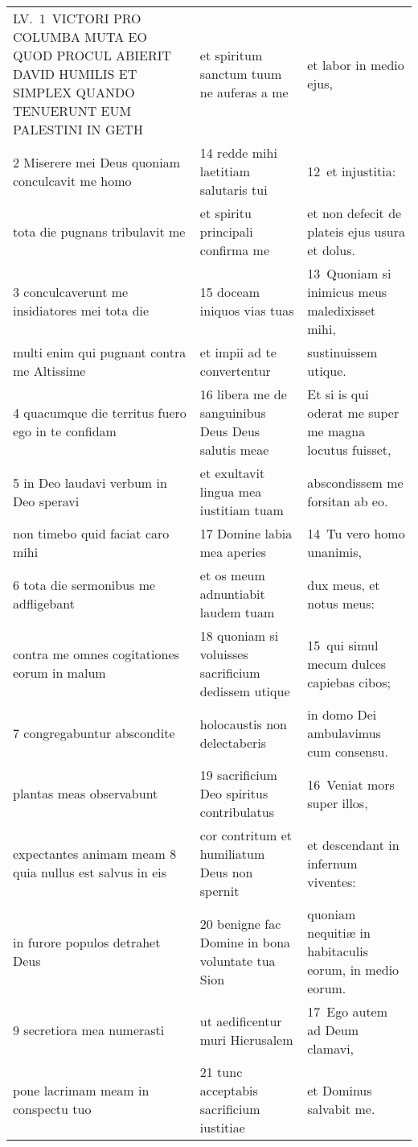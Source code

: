 \documentclass{article}
\begin{document}
\begin{longtable}{@{}p{}p{}p{}@{}}
LV. 1 VICTORI PRO COLUMBA MUTA EO QUOD PROCUL ABIERIT DAVID HUMILIS ET SIMPLEX QUANDO TENUERUNT EUM PALESTINI IN GETH	&	et spiritum sanctum tuum ne auferas a me	&	et labor in medio ejus,	\\
2 Miserere mei Deus quoniam conculcavit me homo	&	14 redde mihi laetitiam salutaris tui	&	12 et injustitia:	\\
tota die pugnans tribulavit me	&	et spiritu principali confirma me	&	et non defecit de plateis ejus usura et dolus.	\\
3 conculcaverunt me insidiatores mei tota die	&	15 doceam iniquos vias tuas	&	13 Quoniam si inimicus meus maledixisset mihi,	\\
multi enim qui pugnant contra me Altissime	&	et impii ad te convertentur	&	sustinuissem utique.	\\
4 quacumque die territus fuero ego in te confidam	&	16 libera me de sanguinibus Deus Deus salutis meae	&	Et si is qui oderat me super me magna locutus fuisset,	\\
5 in Deo laudavi verbum in Deo speravi	&	et exultavit lingua mea iustitiam tuam	&	abscondissem me forsitan ab eo.	\\
non timebo quid faciat caro mihi	&	17 Domine labia mea aperies	&	14 Tu vero homo unanimis,	\\
6 tota die sermonibus me adfligebant	&	et os meum adnuntiabit laudem tuam	&	dux meus, et notus meus:	\\
contra me omnes cogitationes eorum in malum	&	18 quoniam si voluisses sacrificium dedissem utique	&	15 qui simul mecum dulces capiebas cibos;	\\
7 congregabuntur abscondite	&	holocaustis non delectaberis	&	in domo Dei ambulavimus cum consensu.	\\
plantas meas observabunt	&	19 sacrificium Deo spiritus contribulatus	&	16 Veniat mors super illos,	\\
expectantes animam meam 8 quia nullus est salvus in eis	&	cor contritum et humiliatum Deus non spernit	&	et descendant in infernum viventes:	\\
in furore populos detrahet Deus	&	20 benigne fac Domine in bona voluntate tua Sion	&	quoniam nequitiæ in habitaculis eorum, in medio eorum.	\\
9 secretiora mea numerasti	&	ut aedificentur muri Hierusalem	&	17 Ego autem ad Deum clamavi,	\\
pone lacrimam meam in conspectu tuo	&	21 tunc acceptabis sacrificium iustitiae	&	et Dominus salvabit me.	\\

\end{longtable}
\end{document}
